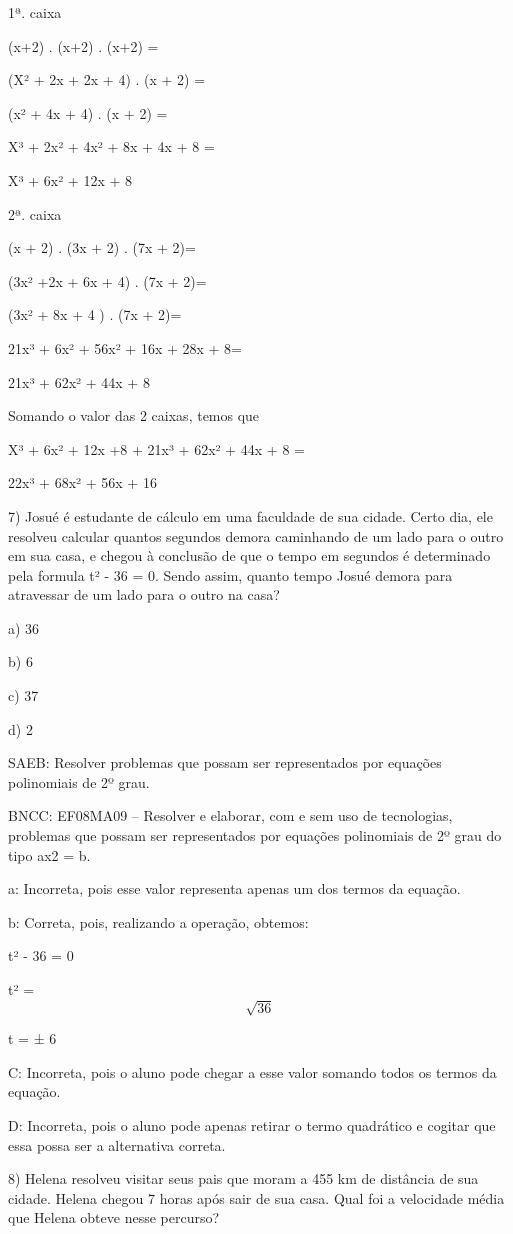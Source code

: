 1ª. caixa

(x+2) . (x+2) . (x+2) =

(X² + 2x + 2x + 4) . (x + 2) =

(x² + 4x + 4) . (x + 2) =

X³ + 2x² + 4x² + 8x + 4x + 8 =

X³ + 6x² + 12x + 8

2ª. caixa

(x + 2) . (3x + 2) . (7x + 2)=

(3x² +2x + 6x + 4) . (7x + 2)=

(3x² + 8x + 4 ) . (7x + 2)=

21x³ + 6x² + 56x² + 16x + 28x + 8=

21x³ + 62x² + 44x + 8

Somando o valor das 2 caixas, temos que

X³ + 6x² + 12x +8 + 21x³ + 62x² + 44x + 8 =

22x³ + 68x² + 56x + 16

7) Josué é estudante de cálculo em uma faculdade de sua cidade. Certo
dia, ele resolveu calcular quantos segundos demora caminhando de um lado
para o outro em sua casa, e chegou à conclusão de que o tempo em
segundos é determinado pela formula t² - 36 = 0. Sendo assim, quanto
tempo Josué demora para atravessar de um lado para o outro na casa?

a) 36

b) 6

c) 37

d) 2

SAEB: Resolver problemas que possam ser representados por equações
polinomiais de 2º grau.

BNCC: EF08MA09 -- Resolver e elaborar, com e sem uso de tecnologias,
problemas que possam ser representados por equações polinomiais de 2º
grau do tipo ax2 = b.

a: Incorreta, pois esse valor representa apenas um dos termos da
equação.

b: Correta, pois, realizando a operação, obtemos:

t² - 36 = 0

t² = \[\sqrt{36}\]

t = ± 6

C: Incorreta, pois o aluno pode chegar a esse valor somando todos os
termos da equação.

D: Incorreta, pois o aluno pode apenas retirar o termo quadrático e
cogitar que essa possa ser a alternativa correta.

8) Helena resolveu visitar seus pais que moram a 455 km de distância de
sua cidade. Helena chegou 7 horas após sair de sua casa. Qual foi a
velocidade média que Helena obteve nesse percurso?

